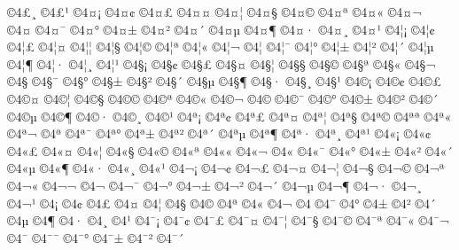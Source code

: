 {^^a94^^a3^^b8
^^a94^^a3^^b9
^^a94^^a4^^a1
^^a94^^a4^^a2
^^a94^^a4^^a3
^^a94^^a4^^a4
^^a94^^a4^^a6
^^a94^^a4^^a7
^^a94^^a4^^a9
^^a94^^a4^^aa
^^a94^^a4^^ab
^^a94^^a4^^ac
^^a94^^a4^^ad
^^a94^^a4^^af
^^a94^^a4^^b0
^^a94^^a4^^b1
^^a94^^a4^^b2
^^a94^^a4^^b4
^^a94^^a4^^b5
^^a94^^a4^^b6
^^a94^^a4^^b7
^^a94^^a4^^b8
^^a94^^a4^^b9
^^a94^^a6^^a1
^^a94^^a6^^a2
^^a94^^a6^^a3
^^a94^^a6^^a4
^^a94^^a6^^a6
^^a94^^a6^^a7
^^a94^^a6^^a9
^^a94^^a6^^aa
^^a94^^a6^^ab
^^a94^^a6^^ac
^^a94^^a6^^ad
^^a94^^a6^^af
^^a94^^a6^^b0
^^a94^^a6^^b1
^^a94^^a6^^b2
^^a94^^a6^^b4
^^a94^^a6^^b5
^^a94^^a6^^b6
^^a94^^a6^^b7
^^a94^^a6^^b8
^^a94^^a6^^b9
^^a94^^a7^^a1
^^a94^^a7^^a2
^^a94^^a7^^a3
^^a94^^a7^^a4
^^a94^^a7^^a6
^^a94^^a7^^a7
^^a94^^a7^^a9
^^a94^^a7^^aa
^^a94^^a7^^ab
^^a94^^a7^^ac
^^a94^^a7^^ad
^^a94^^a7^^af
^^a94^^a7^^b0
^^a94^^a7^^b1
^^a94^^a7^^b2
^^a94^^a7^^b4
^^a94^^a7^^b5
^^a94^^a7^^b6
^^a94^^a7^^b7
^^a94^^a7^^b8
^^a94^^a7^^b9
^^a94^^a9^^a1
^^a94^^a9^^a2
^^a94^^a9^^a3
^^a94^^a9^^a4
^^a94^^a9^^a6
^^a94^^a9^^a7
^^a94^^a9^^a9
^^a94^^a9^^aa
^^a94^^a9^^ab
^^a94^^a9^^ac
^^a94^^a9^^ad
^^a94^^a9^^af
^^a94^^a9^^b0
^^a94^^a9^^b1
^^a94^^a9^^b2
^^a94^^a9^^b4
^^a94^^a9^^b5
^^a94^^a9^^b6
^^a94^^a9^^b7
^^a94^^a9^^b8
^^a94^^a9^^b9
^^a94^^aa^^a1
^^a94^^aa^^a2
^^a94^^aa^^a3
^^a94^^aa^^a4
^^a94^^aa^^a6
^^a94^^aa^^a7
^^a94^^aa^^a9
^^a94^^aa^^aa
^^a94^^aa^^ab
^^a94^^aa^^ac
^^a94^^aa^^ad
^^a94^^aa^^af
^^a94^^aa^^b0
^^a94^^aa^^b1
^^a94^^aa^^b2
^^a94^^aa^^b4
^^a94^^aa^^b5
^^a94^^aa^^b6
^^a94^^aa^^b7
^^a94^^aa^^b8
^^a94^^aa^^b9
^^a94^^ab^^a1
^^a94^^ab^^a2
^^a94^^ab^^a3
^^a94^^ab^^a4
^^a94^^ab^^a6
^^a94^^ab^^a7
^^a94^^ab^^a9
^^a94^^ab^^aa
^^a94^^ab^^ab
^^a94^^ab^^ac
^^a94^^ab^^ad
^^a94^^ab^^af
^^a94^^ab^^b0
^^a94^^ab^^b1
^^a94^^ab^^b2
^^a94^^ab^^b4
^^a94^^ab^^b5
^^a94^^ab^^b6
^^a94^^ab^^b7
^^a94^^ab^^b8
^^a94^^ab^^b9
^^a94^^ac^^a1
^^a94^^ac^^a2
^^a94^^ac^^a3
^^a94^^ac^^a4
^^a94^^ac^^a6
^^a94^^ac^^a7
^^a94^^ac^^a9
^^a94^^ac^^aa
^^a94^^ac^^ab
^^a94^^ac^^ac
^^a94^^ac^^ad
^^a94^^ac^^af
^^a94^^ac^^b0
^^a94^^ac^^b1
^^a94^^ac^^b2
^^a94^^ac^^b4
^^a94^^ac^^b5
^^a94^^ac^^b6
^^a94^^ac^^b7
^^a94^^ac^^b8
^^a94^^ac^^b9
^^a94^^ad^^a1
^^a94^^ad^^a2
^^a94^^ad^^a3
^^a94^^ad^^a4
^^a94^^ad^^a6
^^a94^^ad^^a7
^^a94^^ad^^a9
^^a94^^ad^^aa
^^a94^^ad^^ab
^^a94^^ad^^ac
^^a94^^ad^^ad
^^a94^^ad^^af
^^a94^^ad^^b0
^^a94^^ad^^b1
^^a94^^ad^^b2
^^a94^^ad^^b4
^^a94^^ad^^b5
^^a94^^ad^^b6
^^a94^^ad^^b7
^^a94^^ad^^b8
^^a94^^ad^^b9
^^a94^^af^^a1
^^a94^^af^^a2
^^a94^^af^^a3
^^a94^^af^^a4
^^a94^^af^^a6
^^a94^^af^^a7
^^a94^^af^^a9
^^a94^^af^^aa
^^a94^^af^^ab
^^a94^^af^^ac
^^a94^^af^^ad
^^a94^^af^^af
^^a94^^af^^b0
^^a94^^af^^b1
^^a94^^af^^b2
^^a94^^af^^b4
}

